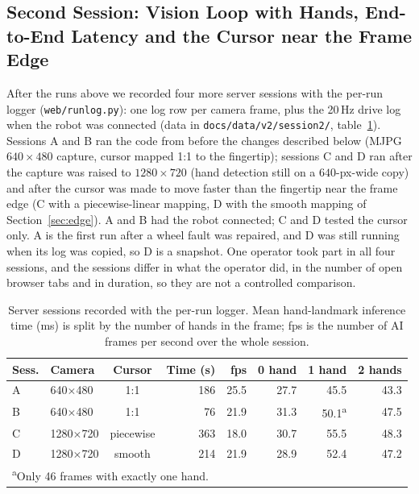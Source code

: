 \documentclass[11pt,a4paper]{article}
\begin{document}
\subsection{Second Session: Vision Loop with Hands, End-to-End Latency and the Cursor near the Frame Edge}
After the runs above we recorded four more server sessions with the per-run logger (\texttt{web/runlog.py}): one log row per camera frame, plus the 20\,Hz drive log when the robot was connected (data in \texttt{docs/data/v2/session2/}, table~\ref{tab:sess2}). Sessions A and B ran the code from before the changes described below (MJPG $640\times480$ capture, cursor mapped 1:1 to the fingertip); sessions C and D ran after the capture was raised to $1280\times720$ (hand detection still on a $640$-px-wide copy) and after the cursor was made to move faster than the fingertip near the frame edge (C with a piecewise-linear mapping, D with the smooth mapping of Section~\ref{sec:edge}). A and B had the robot connected; C and D tested the cursor only. A is the first run after a wheel fault was repaired, and D was still running when its log was copied, so D is a snapshot. One operator took part in all four sessions, and the sessions differ in what the operator did, in the number of open browser tabs and in duration, so they are not a controlled comparison.

\begin{table}[H]
\caption{Server sessions recorded with the per-run logger. Mean hand-landmark inference time (ms) is split by the number of hands in the frame; fps is the number of AI frames per second over the whole session.}
\label{tab:sess2}
\centering
\footnotesize
\setlength{\tabcolsep}{3pt}
\begin{tabular}{llcrrrrr}
\toprule
Sess. & Camera & Cursor & Time (s) & fps & 0 hand & 1 hand & 2 hands \\
\midrule
A & 640$\times$480 & 1:1 & 186 & 25.5 & 27.7 & 45.5 & 43.3 \\
B & 640$\times$480 & 1:1 & 76 & 21.9 & 31.3 & 50.1\textsuperscript{a} & 47.5 \\
C & 1280$\times$720 & piecewise & 363 & 18.0 & 30.7 & 55.5 & 48.3 \\
D & 1280$\times$720 & smooth & 214 & 21.9 & 28.9 & 52.4 & 47.2 \\
\bottomrule
\multicolumn{8}{l}{\footnotesize\textsuperscript{a}Only 46 frames with exactly one hand.}\\
\end{tabular}
\end{table}
\end{document}
